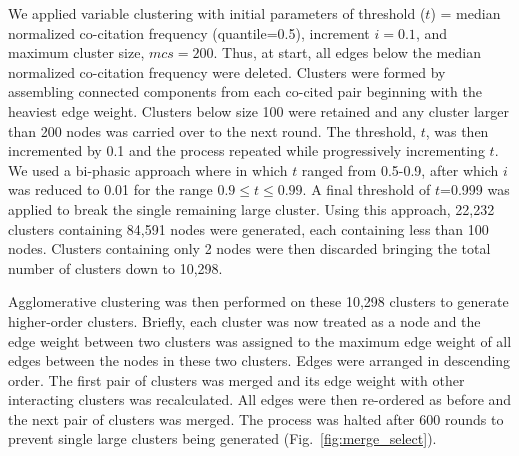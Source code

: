 We applied variable clustering with initial parameters of threshold ($t$) = median normalized co-citation frequency (quantile=0.5), increment $i = 0.1$, and maximum cluster size, $mcs=200$. Thus, at start, all edges below the median normalized co-citation frequency were deleted. Clusters were formed by assembling connected components from each co-cited pair beginning with the heaviest edge weight. Clusters below size 100 were retained and any cluster larger than 200 nodes was carried over to the next round. The threshold, $t$, was then incremented by 0.1 and the process repeated while progressively incrementing $t$.  We used a bi-phasic approach where in which $t$ ranged from 0.5-0.9, after which $i$ was reduced to 0.01 for the range $0.9 \leq t \leq 0.99$. A final threshold of $t$=0.999 was applied to break the single remaining large cluster. %
Using this approach, 22,232 clusters containing 84,591 nodes were generated, each containing less than 100 nodes. Clusters containing only 2 nodes were then discarded bringing the total number of clusters down to 10,298. 

Agglomerative clustering was then performed on these 10,298 clusters to generate higher-order clusters. Briefly, each cluster was now treated as a node and the edge weight between two clusters was assigned to the maximum edge weight of all edges between the nodes in these two clusters. Edges were arranged in descending order. The first pair of clusters was merged and its edge weight with other interacting clusters was recalculated. All edges were then re-ordered as before and the next pair of clusters was merged. The process was halted after 600 rounds to prevent single large clusters being generated (Fig.~\ref{fig:merge_select}).

